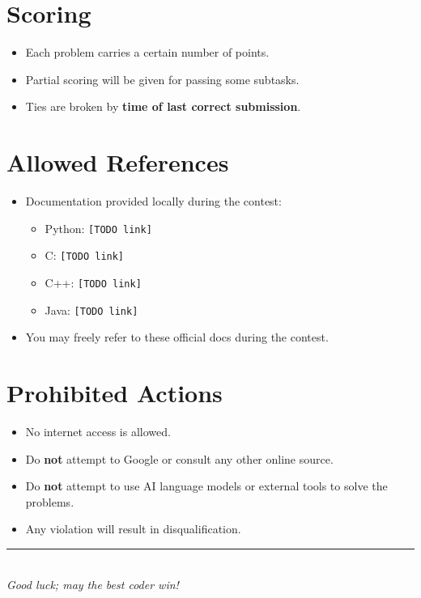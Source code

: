 \documentclass[12pt,a4paper]{article}
\begin{document}
\section*{Scoring}
\begin{itemize}[leftmargin=1.5em]
    \item Each problem carries a certain number of points.  
    \item Partial scoring will be given for passing some subtasks.  
    \item Ties are broken by \textbf{time of last correct submission}.  
\end{itemize}

\section*{Allowed References}
\begin{itemize}[leftmargin=1.5em]
    \item Documentation provided locally during the contest:  
    \begin{itemize}
        \item Python: \texttt{[TODO link]}
        \item C: \texttt{[TODO link]}
        \item C++: \texttt{[TODO link]}
        \item Java: \texttt{[TODO link]}
    \end{itemize}
    \item You may freely refer to these official docs during the contest.  
\end{itemize}

\section*{Prohibited Actions}
\begin{itemize}[leftmargin=1.5em]
    \item No internet access is allowed.  
    \item Do \textbf{not} attempt to Google or consult any other online source.  
    \item Do \textbf{not} attempt to use AI language models or external tools to solve the problems.  
    \item Any violation will result in disqualification.  
\end{itemize}

\vfill
\begin{center}
    \rule{0.8\textwidth}{0.4pt} \\[0.5em]
    \textit{Good luck; may the best coder win!}
\end{center}
\end{document}
